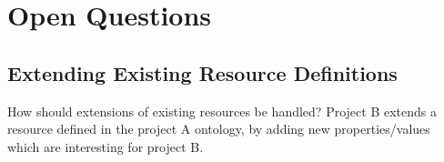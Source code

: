 \documentclass[12pt, a4paper]{article}
\begin{document}
\section{Open Questions}

\subsection{Extending Existing Resource Definitions}

How should extensions of existing resources be handled? Project B extends a resource defined in the project A ontology, by adding new properties/values which are interesting for project B.

\printbibliography
\end{document}
